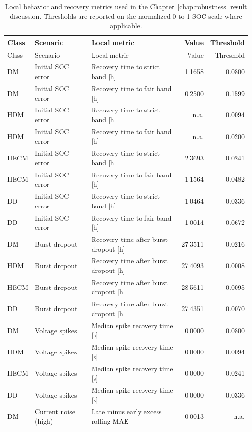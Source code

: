 \documentclass[
    a4paper,
    12pt,
    titlepage,
    bibliography=totoc,
    twoside=on,
    parskip=false,
    numbers=noenddot,
    cleardoublepage=empty,
    DIV=12,
    BCOR=12.0mm,
    headheight=36pt,
    headings=openright
]{scrreprt}
\begin{document}
\begin{longtable}{p{1.2cm}p{2.6cm}p{4.4cm}rr}
\caption[Local robustness and recovery metrics.]{Local behavior and recovery metrics used in the Chapter~\ref{chap:robustness} result discussion. Thresholds are reported on the normalized 0 to 1 SOC scale where applicable.}\label{tab:robustness_appendix_local_metrics}\\
\toprule
Class & Scenario & Local metric & Value & Threshold \\
\midrule
\endfirsthead
\toprule
Class & Scenario & Local metric & Value & Threshold \\
\midrule
\endhead
DM & Initial SOC error & Recovery time to strict band [h] & 1.1658 & 0.0800 \\
DM & Initial SOC error & Recovery time to fair band [h] & 0.2500 & 0.1599 \\
HDM & Initial SOC error & Recovery time to strict band [h] & n.a. & 0.0094 \\
HDM & Initial SOC error & Recovery time to fair band [h] & n.a. & 0.0200 \\
HECM & Initial SOC error & Recovery time to strict band [h] & 2.3693 & 0.0241 \\
HECM & Initial SOC error & Recovery time to fair band [h] & 1.1564 & 0.0482 \\
DD & Initial SOC error & Recovery time to strict band [h] & 1.0464 & 0.0336 \\
DD & Initial SOC error & Recovery time to fair band [h] & 1.0014 & 0.0672 \\
DM & Burst dropout & Recovery time after burst dropout [h] & 27.3511 & 0.0216 \\
HDM & Burst dropout & Recovery time after burst dropout [h] & 27.4093 & 0.0008 \\
HECM & Burst dropout & Recovery time after burst dropout [h] & 28.5611 & 0.0095 \\
DD & Burst dropout & Recovery time after burst dropout [h] & 27.4351 & 0.0070 \\
DM & Voltage spikes & Median spike recovery time [s] & 0.0000 & 0.0800 \\
HDM & Voltage spikes & Median spike recovery time [s] & 0.0000 & 0.0094 \\
HECM & Voltage spikes & Median spike recovery time [s] & 0.0000 & 0.0241 \\
DD & Voltage spikes & Median spike recovery time [s] & 0.0000 & 0.0336 \\
DM & Current noise (high) & Late minus early excess rolling MAE & -0.0013 & n.a. \\

\end{longtable}
\end{document}
